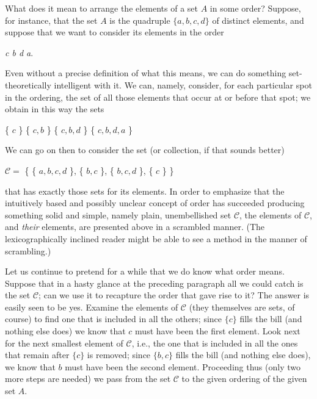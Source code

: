 

What does it mean to arrange the elements of a set $A$ in some order? Suppose, for instance, that the set $A$ is the quadruple $ \{a, b, c, d \} $ of distinct elements, and suppose that we want to consider its elements in the order 
\begin{center}
\textit{c b d a}.
\end{center}
Even without a precise definition of what this means, we can do something set-theoretically intelligent with it. We can, namely, consider, for each particular spot in the ordering, the set of all those elements that occur at or before that spot; we obtain in this way the sets 
\begin{center}
 \{ $c$ \}  \{ $c, b$ \} \{ $c, b, d$ \} \{ $c, b, d, a$ \} 
\end{center}
We can go on then to consider the set (or collection, if that sounds better) 
\begin{center}
$\mathcal{C} = $ \{ \{ $a, b, c, d$ \}, \{ $b, c$ \}, \{ $b, c, d$ \}, \{ $c$ \} \} 
\end{center}
that has exactly those sets for its elements. In order to emphasize that the intuitively based and possibly unclear concept of order has succeeded producing something solid and simple, namely plain,  unembellished set $ \mathcal{C} $, the elements of $ \mathcal{C} $, and \textit{their} elements, are presented above in a scrambled manner. (The lexicographically inclined reader might be able to see a method in the manner of scrambling.) 

Let us continue to pretend for a while that we do know what order means. Suppose that in a hasty glance at the preceding paragraph all we could catch is the set $\mathcal{C}$; can we use it to recapture the order that gave rise to it? The answer is easily seen to be yes. Examine the elements of $ \mathcal{C} $ (they themselves are sets, of course) to find one that is included in all the others; since $ \{c \}$ fills the bill (and nothing else does) we know that $c$ must have been the first element. Look next for the next smallest element of $ \mathcal{C}$, i.e., the one that is included in all the ones that remain after $ \{ c \} $ is removed; since $ \{ b, c \} $ fills the bill (and nothing else does), we know that $b$ must have been the second element. Proceeding thus (only two more steps are needed) we pass from the set $ \mathcal{C} $ to the given ordering of the given set $A$. 

